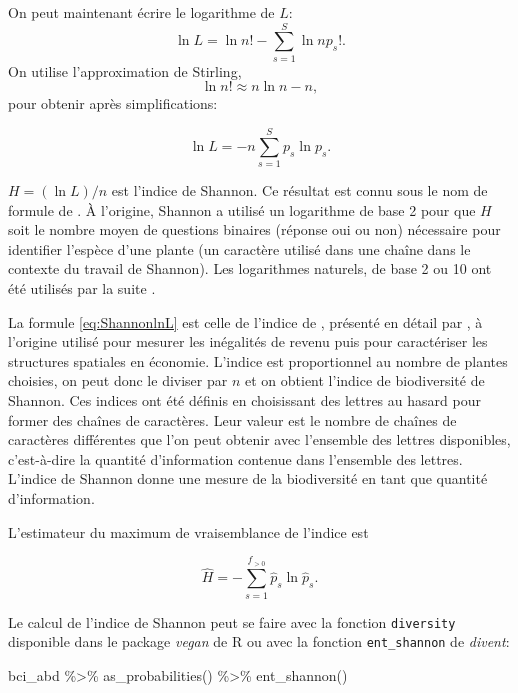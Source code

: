 \documentclass[
  11pt,
  american,
  a4paper,
  extrafontsizes,onecolumn,openright
  ]{memoir}
\newenvironment{Shaded}{\begin{snugshade}}{\end{snugshade}}
\newcommand{\FunctionTok}[1]{\textcolor[rgb]{0.00,0.00,0.00}{#1}}
\newcommand{\NormalTok}[1]{#1}
\newcommand{\SpecialCharTok}[1]{\textcolor[rgb]{0.00,0.00,0.00}{#1}}
\begin{document}
On peut maintenant écrire le logarithme de \(L\):
\[\ln{L} = \ln{n!} - \sum^S_{s=1}{\ln{np_s}!}.\]
On utilise l'approximation de Stirling,
\[\ln{n!} \approx n \ln{n} - n,\]
pour obtenir après simplifications:

\begin{equation}
  \label{eq:ShannonlnL}
  \ln{L} = -n \sum^S_{s=1}{p_s \ln{p_s}}.
\end{equation}

\(H = (\ln{L}) / n\) est l'indice de Shannon.
Ce résultat est connu sous le nom de formule de \textcite{Brillouin1962}.
À l'origine, Shannon a utilisé un logarithme de base 2 pour que \(H\) soit le nombre moyen de questions binaires (réponse oui ou non) nécessaire pour identifier l'espèce d'une plante (un caractère utilisé dans une chaîne dans le contexte du travail de Shannon).
Les logarithmes naturels, de base 2 ou 10 ont été utilisés par la suite \autocite{Pielou1966a}.

La formule \eqref{eq:ShannonlnL} est celle de l'indice de \textcite{Theil1967}, présenté en détail par \textcite{Conceicao2000}, à l'origine utilisé pour mesurer les inégalités de revenu puis pour caractériser les structures spatiales en économie.
L'indice est proportionnel au nombre de plantes choisies, on peut donc le diviser par \(n\) et on obtient l'indice de biodiversité de Shannon.
Ces indices ont été définis en choisissant des lettres au hasard pour former des chaînes de caractères.
Leur valeur est le nombre de chaînes de caractères différentes que l'on peut obtenir avec l'ensemble des lettres disponibles, c'est-à-dire la quantité d'information contenue dans l'ensemble des lettres.
L'indice de Shannon donne une mesure de la biodiversité en tant que quantité d'information.

L'estimateur du maximum de vraisemblance de l'indice est

\begin{equation}
  \label{eq:EstShannonML}
  \hat{H} = -\sum^{f_{>0}}_{s=1}{\hat{p}_s \ln{\hat{p}_s}}.
\end{equation}

Le calcul de l'indice de Shannon peut se faire avec la fonction \texttt{diversity} disponible dans le package \emph{vegan} de R ou avec la fonction \texttt{ent\_shannon} de \emph{divent}:

\scriptsize

\begin{Shaded}
\begin{Highlighting}[]
\NormalTok{bci\_abd }\SpecialCharTok{\%\textgreater{}\%} 
  \FunctionTok{as\_probabilities}\NormalTok{() }\SpecialCharTok{\%\textgreater{}\%} 
  \FunctionTok{ent\_shannon}\NormalTok{()}
\end{Highlighting}
\end{Shaded}
\end{document}
